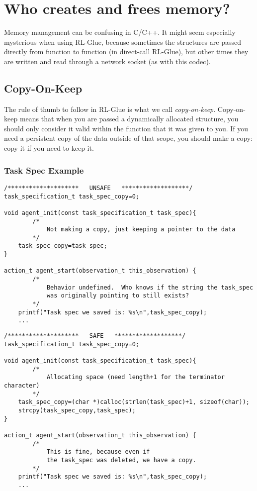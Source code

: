 \documentclass[11pt]{article}
\begin{document}
\section{Who creates and frees memory?}
Memory management can be confusing in C/C++.  It might seem especially mysterious when using RL-Glue, because sometimes the structures are passed directly 
from function to function (in direct-call RL-Glue), but other times they are written and read through a network socket (as with this codec).

\subsection{Copy-On-Keep}
The rule of thumb to follow in RL-Glue is what we call \textit{copy-on-keep}.  Copy-on-keep means that when you are passed a dynamically allocated structure, you should
only consider it valid within the function that it was given to you.  If you need a persistent copy of the data outside of that scope, you should make a copy: copy it if you
need to keep it.

\subsubsection{Task Spec Example}
\begin{verbatim}
/********************   UNSAFE   *******************/
task_specification_t task_spec_copy=0;
	
void agent_init(const task_specification_t task_spec){
        /*
            Not making a copy, just keeping a pointer to the data 
        */
    task_spec_copy=task_spec;
}

action_t agent_start(observation_t this_observation) {
        /*
            Behavior undefined.  Who knows if the string the task_spec
            was originally pointing to still exists?
        */
    printf("Task spec we saved is: %s\n",task_spec_copy);
    ...
\end{verbatim}

\begin{verbatim}
/********************   SAFE   *******************/
task_specification_t task_spec_copy=0;
	
void agent_init(const task_specification_t task_spec){
        /*
            Allocating space (need length+1 for the terminator character)
        */
    task_spec_copy=(char *)calloc(strlen(task_spec)+1, sizeof(char));
    strcpy(task_spec_copy,task_spec);
}

action_t agent_start(observation_t this_observation) {
        /*
            This is fine, because even if 
            the task_spec was deleted, we have a copy.
        */
    printf("Task spec we saved is: %s\n",task_spec_copy);
    ...
\end{verbatim}
\end{document}
